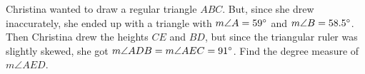 Christina wanted to draw a regular triangle $ABC$. But, since she drew inaccurately, she ended up with a triangle with $m{\angle}A=59\degree$ and $m{\angle}B=58.5\degree$. Then Christina drew the heights $CE$ and $BD$, but since the triangular ruler was slightly skewed, she got $m{\angle}ADB=m{\angle}AEC=91\degree$. Find the degree measure of $m\angle{AED}$.